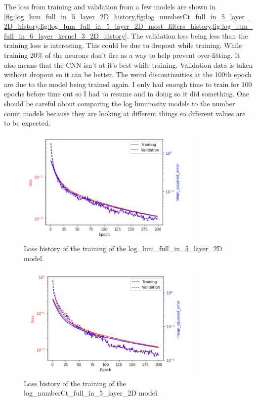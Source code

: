 \documentclass{article}
\begin{document}
			The loss from training and validation from a few models are shown in \cref{fig:log_lum_full_in_5_layer_2D_history,fig:log_numberCt_full_in_5_layer_2D_history,fig:log_lum_full_in_5_layer_2D_most_filters_history,fig:log_lum_full_in_6_layer_kernel_3_2D_history}.  The validation loss being less than the training loss is interesting.  This could be due to dropout while training.  While training 20\% of the neurons don't fire as a way to help prevent over-fitting.  It also means that the CNN isn't at it's best while training.  Validation data is taken without dropout so it can be better.  The weird discontinuities at the 100th epoch are due to the model being trained again.  I only had enough time to train for 100 epochs before time out so I had to resume and in doing so it did something.  One should be careful about comparing the log luminosity models to the number count models because they are looking at different things so different values are to be expected.

			\begin{figure}[H]
				\centering
				\includegraphics[width=0.8\textwidth]{log_lum_full_in_5_layer_2D_history.pdf}
				\caption{Loss history of the training of the log\_lum\_full\_in\_5\_layer\_2D model.}
				\label{fig:log_lum_full_in_5_layer_2D_history}
			\end{figure}

			\begin{figure}[H]
				\centering
				\includegraphics[width=0.8\textwidth]{log_numberCt_full_in_5_layer_2D_history.pdf}
				\caption{Loss history of the training of the log\_numberCt\_full\_in\_5\_layer\_2D model.}
				\label{fig:log_numberCt_full_in_5_layer_2D_history}
			\end{figure}
\end{document}
